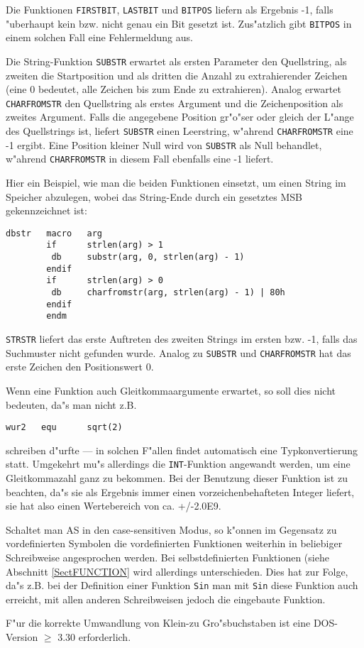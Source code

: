 \documentclass[12pt,a4paper,twoside]{report}
\newcommand{\tty}[1]{{\tt #1}}
\begin{document}
Die Funktionen \tty{FIRSTBIT}, \tty{LASTBIT} und \tty{BITPOS} liefern
als Ergebnis -1, falls "uberhaupt kein bzw. nicht genau ein Bit gesetzt
ist. Zus"atzlich gibt \tty{BITPOS} in einem solchen Fall eine
Fehlermeldung aus.
\par
Die String-Funktion \tty{SUBSTR} erwartet als ersten Parameter den
Quellstring, als zweiten die Startposition und als dritten die Anzahl zu
extrahierender Zeichen (eine 0 bedeutet, alle Zeichen bis zum Ende zu
extrahieren).  Analog erwartet \tty{CHARFROMSTR} den Quellstring als
erstes Argument und die Zeichenposition als zweites Argument.  Falls die
angegebene Position gr"o"ser oder gleich der L"ange des Quellstrings ist,
liefert \tty{SUBSTR} einen Leerstring, w"ahrend \tty{CHARFROMSTR} eine -1
ergibt.  Eine Position kleiner Null wird von \tty{SUBSTR} als Null
behandlet, w"ahrend \tty{CHARFROMSTR} in diesem Fall ebenfalls eine -1
liefert.

Hier ein Beispiel, wie man die beiden Funktionen einsetzt, um einen
String im Speicher abzulegen, wobei das String-Ende durch ein gesetztes
MSB gekennzeichnet ist:

\begin{verbatim}
dbstr   macro   arg
        if      strlen(arg) > 1
         db     substr(arg, 0, strlen(arg) - 1)
        endif
        if      strlen(arg) > 0
         db     charfromstr(arg, strlen(arg) - 1) | 80h
        endif
        endm
\end{verbatim}

\tty{STRSTR} liefert das erste Auftreten des zweiten Strings
im ersten bzw. -1, falls das Suchmuster nicht gefunden wurde. 
Analog zu \tty{SUBSTR} und \tty{CHARFROMSTR} hat das erste
Zeichen den Positionswert 0.

Wenn eine Funktion auch Gleitkommaargumente erwartet, so soll
dies nicht bedeuten, da"s man nicht z.B.
\begin{verbatim}
wur2   equ      sqrt(2)
\end{verbatim}
schreiben d"urfte --- in solchen F"allen findet automatisch eine
Typkonvertierung statt.  Umgekehrt mu"s allerdings die \tty{INT}-Funktion
angewandt werden, um eine Gleitkommazahl ganz zu bekommen.  Bei der
Benutzung dieser Funktion ist zu beachten, da"s sie als Ergebnis
immer einen vorzeichenbehafteten Integer liefert, sie hat also
einen Wertebereich von ca. +/-2.0E9.
\par
Schaltet man AS in den case-sensitiven Modus, so k"onnen im
Gegensatz zu vordefinierten Symbolen die vordefinierten Funktionen
weiterhin in beliebiger Schreibweise angesprochen werden.  Bei
selbstdefinierten Funktionen (siehe Abschnitt \ref{SectFUNCTION}
wird allerdings unterschieden.  Dies  hat zur Folge, da"s z.B. bei
der Definition einer Funktion \tty{Sin} man mit \tty{Sin} diese
Funktion auch erreicht, mit allen anderen Schreibweisen jedoch die
eingebaute Funktion.
\par
F"ur die korrekte Umwandlung  von Klein-zu
Gro"sbuchstaben ist eine DOS-Version $\geq$ 3.30
erforderlich.
\end{document}
